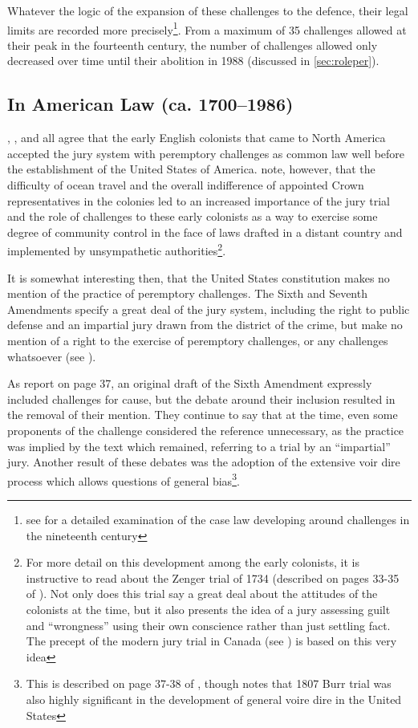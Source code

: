 Whatever the logic of the expansion of these challenges to the defence, their legal limits are recorded more
precisely\footnote{see \cite{brown2000} for a detailed examination of the case law developing around challenges in the nineteenth
  century}. From a maximum of 35 challenges allowed at their peak in the fourteenth century, the number of challenges allowed only
decreased over time until their abolition in 1988 (discussed in \ref{sec:roleper}).

\subsection{In American Law (ca. 1700--1986)}

\cite{vonmosch1921}, \cite{hoffman1997}, and \cite{vandykejurysel} all agree that the early English colonists that came to North
America accepted the jury system with peremptory challenges as common law well before the establishment of the United States of
America. \cite{hansvidjudging} note, however, that the difficulty of ocean travel and the overall indifference of appointed Crown
representatives in the colonies led to an increased importance of the jury trial and the role of challenges to these early
colonists as a way to exercise some degree of community control in the face of laws drafted in a distant country and implemented
by unsympathetic authorities\footnote{For more detail on this development among the early colonists, it is instructive to read
  about the Zenger trial of 1734 (described on pages 33-35 of \cite{hansvidjudging}). Not only does this trial say a great deal
  about the attitudes of the colonists at the time, but it also presents the idea of a jury assessing guilt and ``wrongness''
  using their own conscience rather than just settling fact. The precept of the modern jury trial in Canada (see
  \cite{woolley2018}) is based on this very idea}.

It is somewhat interesting then, that the United States constitution makes no mention of the practice of peremptory
challenges. The Sixth and Seventh Amendments specify a great deal of the jury system, including the right to public defense and an
impartial jury drawn from the district of the crime, but make no mention of a right to the exercise of peremptory challenges, or
any challenges whatsoever (see \cite{usconstitution}).

As \cite{hansvidjudging} report on page 37, an original draft of the Sixth Amendment expressly included challenges for cause, but
the debate around their inclusion resulted in the removal of their mention. They continue to say that at the time, even some
proponents of the challenge considered the reference unnecessary, as the practice was implied by the text which remained,
referring to a trial by an ``impartial'' jury. Another result of these debates was the adoption of the extensive voir dire process
which allows questions of general bias\footnote{This is described on page 37-38 of \cite{hansvidjudging}, though \cite{brown2000}
  notes that 1807 Burr trial was also highly significant in the development of general voire dire in the United States}.

